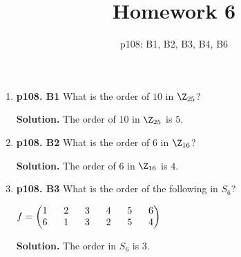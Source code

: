 \documentclass[11pt]{article}
\begin{document}
\title{Homework 6}
\date{p108: B1, B2, B3, B4, B6}
\maketitle

\thispagestyle{fancy}  
\pagestyle{fancy}      

\begin{enumerate}

\item {\bfseries p108. B1} What is the order of $10$ in $\Z_{25}$?
  
 	{\bfseries Solution.} The order of $10$ in $\Z_{25}$ is $5$.

\item {\bfseries p108. B2} What is the order of $6$ in $\Z_{16}$?
  
 	{\bfseries Solution.} The order of $6$ in $\Z_{16}$ is $4$.

\item {\bfseries p108. B3} What is the order of the following in $S_6$?

	$f = \begin{pmatrix}
		1 \hspace{6mm} 2 \hspace{6mm} 3 \hspace{6mm} 4 \hspace{6mm} 5 \hspace{6mm} 6 \\
		6 \hspace{6mm} 1 \hspace{6mm} 3 \hspace{6mm} 2 \hspace{6mm} 5 \hspace{6mm} 4
	\end{pmatrix}$
  
 	{\bfseries Solution.} The order in $S_6$ is $3$.
  

\end{enumerate}
\end{document}
